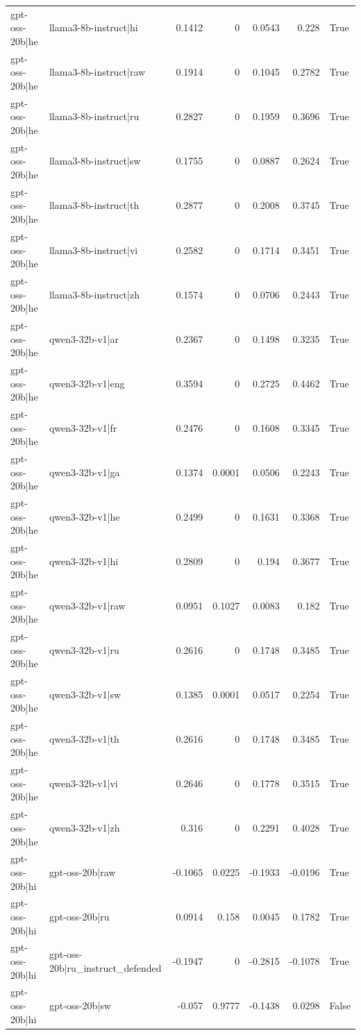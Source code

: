 \begin{table}
\begin{tabular}{l l r r r r l}
gpt-oss-20b|he & llama3-8b-instruct|hi & 0.1412 & 0 & 0.0543 & 0.228 & True \\
gpt-oss-20b|he & llama3-8b-instruct|raw & 0.1914 & 0 & 0.1045 & 0.2782 & True \\
gpt-oss-20b|he & llama3-8b-instruct|ru & 0.2827 & 0 & 0.1959 & 0.3696 & True \\
gpt-oss-20b|he & llama3-8b-instruct|sw & 0.1755 & 0 & 0.0887 & 0.2624 & True \\
gpt-oss-20b|he & llama3-8b-instruct|th & 0.2877 & 0 & 0.2008 & 0.3745 & True \\
gpt-oss-20b|he & llama3-8b-instruct|vi & 0.2582 & 0 & 0.1714 & 0.3451 & True \\
gpt-oss-20b|he & llama3-8b-instruct|zh & 0.1574 & 0 & 0.0706 & 0.2443 & True \\
gpt-oss-20b|he & qwen3-32b-v1|ar & 0.2367 & 0 & 0.1498 & 0.3235 & True \\
gpt-oss-20b|he & qwen3-32b-v1|eng & 0.3594 & 0 & 0.2725 & 0.4462 & True \\
gpt-oss-20b|he & qwen3-32b-v1|fr & 0.2476 & 0 & 0.1608 & 0.3345 & True \\
gpt-oss-20b|he & qwen3-32b-v1|ga & 0.1374 & 0.0001 & 0.0506 & 0.2243 & True \\
gpt-oss-20b|he & qwen3-32b-v1|he & 0.2499 & 0 & 0.1631 & 0.3368 & True \\
gpt-oss-20b|he & qwen3-32b-v1|hi & 0.2809 & 0 & 0.194 & 0.3677 & True \\
gpt-oss-20b|he & qwen3-32b-v1|raw & 0.0951 & 0.1027 & 0.0083 & 0.182 & True \\
gpt-oss-20b|he & qwen3-32b-v1|ru & 0.2616 & 0 & 0.1748 & 0.3485 & True \\
gpt-oss-20b|he & qwen3-32b-v1|sw & 0.1385 & 0.0001 & 0.0517 & 0.2254 & True \\
gpt-oss-20b|he & qwen3-32b-v1|th & 0.2616 & 0 & 0.1748 & 0.3485 & True \\
gpt-oss-20b|he & qwen3-32b-v1|vi & 0.2646 & 0 & 0.1778 & 0.3515 & True \\
gpt-oss-20b|he & qwen3-32b-v1|zh & 0.316 & 0 & 0.2291 & 0.4028 & True \\
gpt-oss-20b|hi & gpt-oss-20b|raw & -0.1065 & 0.0225 & -0.1933 & -0.0196 & True \\
gpt-oss-20b|hi & gpt-oss-20b|ru & 0.0914 & 0.158 & 0.0045 & 0.1782 & True \\
gpt-oss-20b|hi & gpt-oss-20b|ru_instruct_defended & -0.1947 & 0 & -0.2815 & -0.1078 & True \\
gpt-oss-20b|hi & gpt-oss-20b|sw & -0.057 & 0.9777 & -0.1438 & 0.0298 & False \\

\end{tabular}
\end{table}
